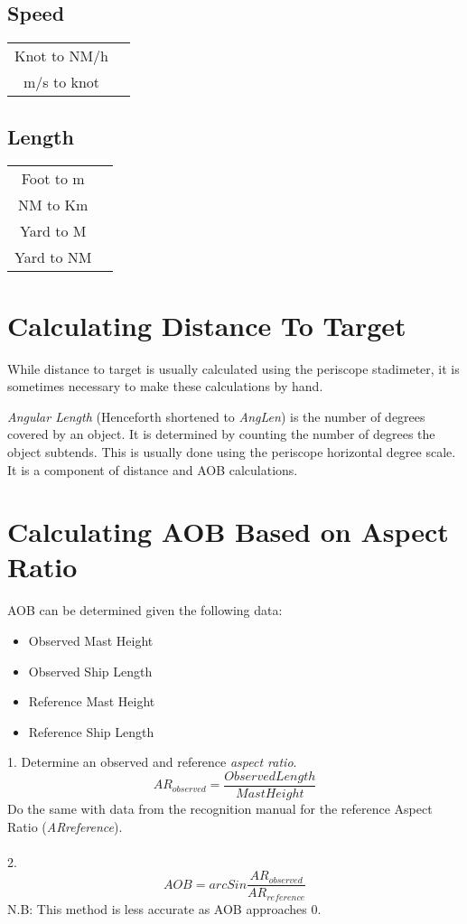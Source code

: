 \documentclass{article}
\begin{document}
\subsection{Speed}

\begin{tabular}{ c c }
Knot to NM/h & \\
m/s to knot & \\
\end{tabular}

\subsection{Length}
\begin{tabular}{ c c }
Foot to m & \\
NM to Km  & \\
Yard to M & \\
Yard to NM & \\
\end{tabular}

\section{Calculating Distance To Target}

While distance to target is usually calculated using the periscope stadimeter, it is sometimes necessary to make these calculations by hand.

\emph{Angular Length} (Henceforth shortened to \emph{AngLen}) is the number of degrees covered by an object. It is determined by counting the number of degrees the object subtends. This is usually done using the periscope horizontal degree scale. It is a component of distance and AOB calculations.

\section{Calculating AOB Based on Aspect Ratio}

AOB can be determined given the following data:
\begin{itemize}
\item{Observed Mast Height}
\item{Observed Ship Length}
\item{Reference Mast Height}
\item{Reference Ship Length}
\end{itemize}
1. Determine an observed and reference \emph{aspect ratio}.
$$AR_{observed} = \frac{Observed Length}{Mast Height}$$
Do the same with data from the recognition manual for the reference Aspect Ratio (\emph{ARreference}). \\ \\
2.
$$AOB = arcSin \frac{AR_{observed}}{AR_{reference}}$$
N.B: This method is less accurate as AOB approaches 0.
\end{document}
